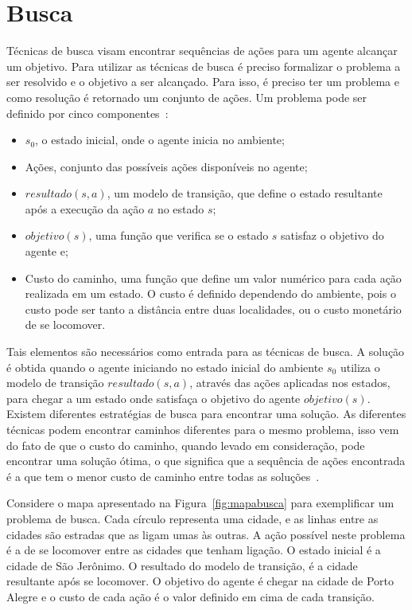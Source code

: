 \chapter{\label{chap:busca}Busca}

Técnicas de busca visam encontrar sequências de ações para um agente alcançar um objetivo.
Para utilizar as técnicas de busca é preciso formalizar o problema a ser resolvido e o objetivo a ser alcançado.
Para isso, é preciso ter um problema e como resolução é retornado um conjunto de ações.
Um problema pode ser definido por cinco componentes~\cite[Capítulo 3]{intelligence2003modern}: 

\begin{itemize}
	\item $s_{0}$, o estado inicial, onde o agente inicia no ambiente;
	\item Ações, conjunto das possíveis ações disponíveis no agente;
	\item $resultado(s, a)$, um modelo de transição, que define o estado resultante após a execução da ação $a$ no estado $s$;
	\item $objetivo(s)$, uma função que verifica se o estado $s$ satisfaz o objetivo do agente e; 
	\item Custo do caminho, uma função que define um valor numérico para cada ação realizada em um estado. O custo é definido dependendo do ambiente, pois o custo pode ser tanto a distância entre duas localidades, ou o custo monetário de se locomover. 
\end{itemize}   

Tais elementos são necessários como entrada para as técnicas de busca.
A solução é obtida quando o agente iniciando no estado inicial do ambiente $s_{0}$ utiliza o modelo de transição $resultado(s, a)$, através das ações aplicadas nos estados, para chegar a um estado onde satisfaça o objetivo do agente $objetivo(s)$.
Existem diferentes estratégias de busca para encontrar uma solução.
As diferentes técnicas podem encontrar caminhos diferentes para o mesmo problema, isso vem do fato de que o custo do caminho, quando levado em consideração, pode encontrar uma solução ótima, o que significa que a sequência de ações encontrada é a que tem o menor custo de caminho entre todas as soluções~\cite[Capítulo 3]{intelligence2003modern}.

Considere o mapa apresentado na Figura~\ref{fig:mapabusca} para exemplificar um problema de busca.
Cada círculo representa uma cidade, e as linhas entre as cidades são estradas que as ligam umas às outras. 
A ação possível neste problema é a de se locomover entre as cidades que tenham ligação.
O estado inicial é a cidade de São Jerônimo. O resultado do modelo de transição, é a cidade resultante após se locomover. O objetivo do agente é chegar na cidade de Porto Alegre e o custo de cada ação é o valor definido em cima de cada transição. 


